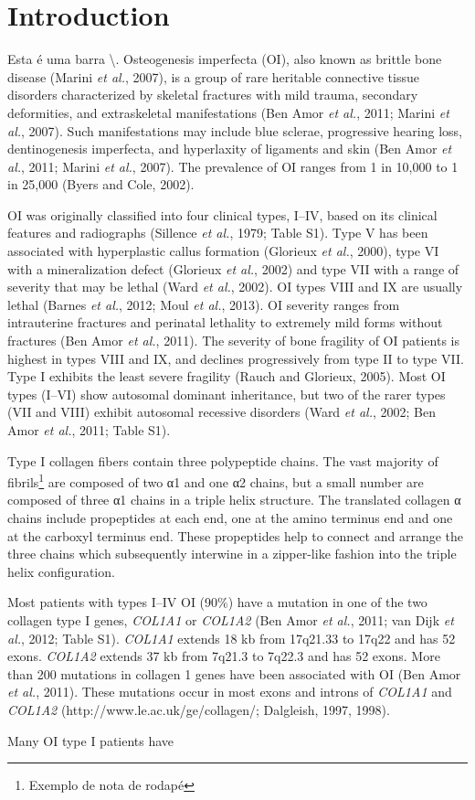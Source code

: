 \section*{Introduction}\par Esta é uma barra \textbackslash. Osteogenesis imperfecta (OI), also known as brittle bone disease (Marini \textit{et al.}, 2007), is a group of rare heritable connective tissue disorders characterized by skeletal fractures with mild trauma, secondary deformities, and extraskeletal manifestations (Ben Amor \textit{et al.}, 2011; Marini \textit{et al.}, 2007). Such manifestations may include blue sclerae, progressive hearing loss, dentinogenesis imperfecta, and hyperlaxity of ligaments and skin (Ben Amor \textit{et al.}, 2011; Marini \textit{et al.}, 2007). The prevalence of OI ranges from 1 in 10,000 to 1 in 25,000 (Byers and Cole, 2002).\par OI was originally classified into four clinical types, I–IV, based on its clinical features and radiographs (Sillence \textit{et al.}, 1979; Table S1). Type V has been associated with hyperplastic callus formation (Glorieux \textit{et al.}, 2000), type VI with a mineralization defect (Glorieux \textit{et al.}, 2002) and type VII with a range of severity that may be lethal (Ward \textit{et al.}, 2002). OI types VIII and IX are usually lethal (Barnes \textit{et al.}, 2012; Moul \textit{et al.}, 2013). OI severity ranges from intrauterine fractures and perinatal lethality to extremely mild forms without fractures (Ben Amor \textit{et al.}, 2011). The severity of bone fragility of OI patients is highest in types VIII and IX, and declines progressively from type II to type VII. Type I exhibits the least severe fragility (Rauch and Glorieux, 2005). Most OI types (I–VI) show autosomal dominant inheritance, but two of the rarer types (VII and VIII) exhibit autosomal recessive disorders (Ward \textit{et al.}, 2002; Ben Amor \textit{et al.}, 2011; Table S1).\par Type I collagen fibers contain three polypeptide chains. The vast majority of fibrils\protect\footnote{Exemplo de nota de rodapé} are composed of two α1 and one α2 chains, but a small number are composed of three α1 chains in a triple helix structure. The translated collagen α chains include propeptides at each end, one at the amino terminus end and one at the carboxyl terminus end. These propeptides help to connect and arrange the three chains which subsequently interwine in a zipper-like fashion into the triple helix configuration.\par Most patients with types I–IV OI (90\%) have a mutation in one of the two collagen type I genes, \textit{COL1A1} or \textit{COL1A2} (Ben Amor \textit{et al.}, 2011; van Dijk \textit{et al.}, 2012; Table S1). \textit{COL1A1} extends 18 kb from 17q21.33 to 17q22 and has 52 exons. \textit{COL1A2} extends 37 kb from 7q21.3 to 7q22.3 and has 52 exons. More than 200 mutations in collagen 1 genes have been associated with OI (Ben Amor \textit{et al.}, 2011). These mutations occur in most exons and introns of \textit{COL1A1} and \textit{COL1A2} (http://www.le.ac.uk/ge/collagen/; Dalgleish, 1997, 1998).\par Many OI type I patients have 